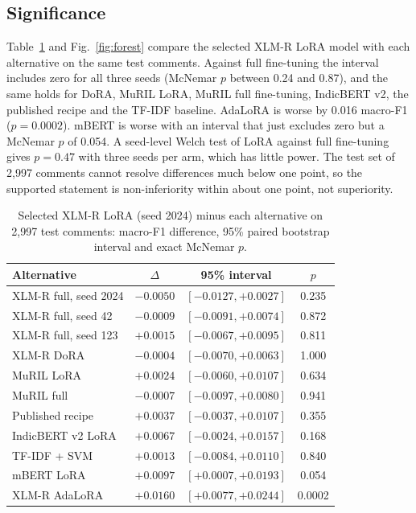 \documentclass[conference]{IEEEtran}
\begin{document}
\subsection{Significance}
Table~\ref{tab:sig} and Fig.~\ref{fig:forest} compare the selected XLM-R LoRA model with each alternative on the same test comments. Against full fine-tuning the interval includes zero for all three seeds (McNemar $p$ between 0.24 and 0.87), and the same holds for DoRA, MuRIL LoRA, MuRIL full fine-tuning, IndicBERT v2, the published recipe and the TF-IDF baseline. AdaLoRA is worse by 0.016 macro-F1 ($p=0.0002$). mBERT is worse with an interval that just excludes zero but a McNemar $p$ of 0.054. A seed-level Welch test of LoRA against full fine-tuning gives $p=0.47$ with three seeds per arm, which has little power. The test set of 2,997 comments cannot resolve differences much below one point, so the supported statement is non-inferiority within about one point, not superiority.

\begin{table}[t]
\caption{Selected XLM-R LoRA (seed 2024) minus each alternative on 2,997 test comments: macro-F1 difference, 95\% paired bootstrap interval and exact McNemar $p$.}
\label{tab:sig}
\centering
\footnotesize
\setlength{\tabcolsep}{3.5pt}
\begin{tabular}{lccc}
\toprule
Alternative & $\Delta$ & 95\% interval & $p$ \\
\midrule
XLM-R full, seed 2024 & $-0.0050$ & $[-0.0127,+0.0027]$ & 0.235 \\
XLM-R full, seed 42 & $-0.0009$ & $[-0.0091,+0.0074]$ & 0.872 \\
XLM-R full, seed 123 & $+0.0015$ & $[-0.0067,+0.0095]$ & 0.811 \\
XLM-R DoRA & $-0.0004$ & $[-0.0070,+0.0063]$ & 1.000 \\
MuRIL LoRA & $+0.0024$ & $[-0.0060,+0.0107]$ & 0.634 \\
MuRIL full & $-0.0007$ & $[-0.0097,+0.0080]$ & 0.941 \\
Published recipe & $+0.0037$ & $[-0.0037,+0.0107]$ & 0.355 \\
IndicBERT v2 LoRA & $+0.0067$ & $[-0.0024,+0.0157]$ & 0.168 \\
TF-IDF + SVM & $+0.0013$ & $[-0.0084,+0.0110]$ & 0.840 \\
mBERT LoRA & $+0.0097$ & $[+0.0007,+0.0193]$ & 0.054 \\
XLM-R AdaLoRA & $+0.0160$ & $[+0.0077,+0.0244]$ & 0.0002 \\
\bottomrule
\end{tabular}
\end{table}
\end{document}
